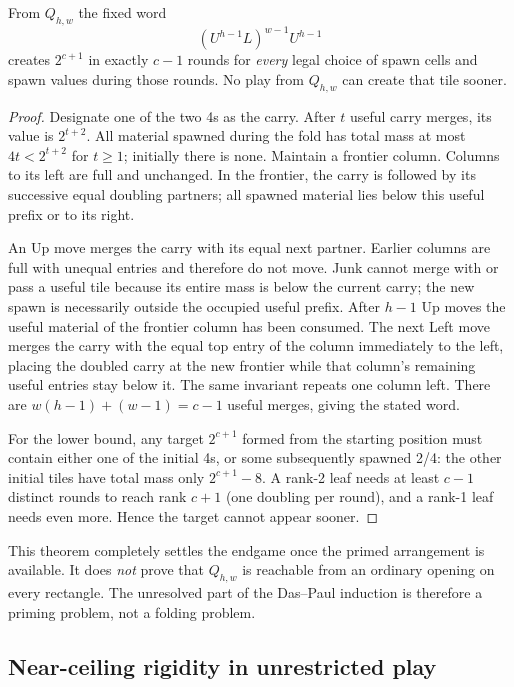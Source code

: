\begin{theorem}\label{thm:rectfold}
From $Q_{h,w}$ the fixed word
\[
 (U^{h-1}L)^{w-1}U^{h-1}
\]
creates $2^{c+1}$ in exactly $c-1$ rounds for \emph{every} legal choice of
spawn cells and spawn values during those rounds.  No play from
$Q_{h,w}$ can create that tile sooner.
\end{theorem}
\begin{proof}
Designate one of the two 4s as the carry.  After $t$ useful carry merges,
its value is $2^{t+2}$.  All material spawned during the fold has total
mass at most $4t<2^{t+2}$ for $t\ge1$; initially there is none.  Maintain
a frontier column.  Columns to its left are full and unchanged.  In the
frontier, the carry is followed by its successive equal doubling partners;
all spawned material lies below this useful prefix or to its right.

An Up move merges the carry with its equal next partner.  Earlier columns
are full with unequal entries and therefore do not move.  Junk cannot
merge with or pass a useful tile because its entire mass is below the
current carry; the new spawn is necessarily outside the occupied useful
prefix.  After $h-1$ Up moves the useful material of the frontier column
has been consumed.  The next Left move merges the carry with the equal
top entry of the column immediately to the left, placing the doubled
carry at the new frontier while that column's remaining useful entries
stay below it.  The same invariant repeats one column left.  There are
$w(h-1)+(w-1)=c-1$ useful merges, giving the stated word.

For the lower bound, any target $2^{c+1}$ formed from the starting
position must contain either one of the initial 4s, or some subsequently
spawned 2/4: the other initial tiles have total mass only $2^{c+1}-8$.
A rank-2 leaf needs at least $c-1$ distinct rounds to reach rank $c+1$
(one doubling per round), and a rank-1 leaf needs even more.  Hence the
target cannot appear sooner.
\end{proof}

This theorem completely settles the endgame once the primed arrangement
is available.  It does \emph{not} prove that $Q_{h,w}$ is reachable from
an ordinary opening on every rectangle.  The unresolved part of the
Das--Paul induction is therefore a priming problem, not a folding problem.

\subsection{Near-ceiling rigidity in unrestricted play}

